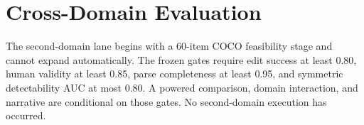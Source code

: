 \section{Cross-Domain Evaluation}
The second-domain lane begins with a 60-item COCO feasibility stage and cannot expand automatically.
The frozen gates require edit success at least 0.80, human validity at least 0.85, parse completeness
at least 0.95, and symmetric detectability AUC at most 0.80. A powered comparison, domain interaction,
and narrative are conditional on those gates. No second-domain execution has occurred.
